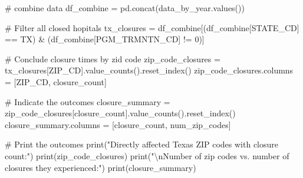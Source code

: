 \documentclass[
  letterpaper,
  DIV=11,
  numbers=noendperiod]{scrartcl}
\newenvironment{Shaded}{\begin{snugshade}}{\end{snugshade}}
\newcommand{\BuiltInTok}[1]{\textcolor[rgb]{0.00,0.23,0.31}{#1}}
\newcommand{\CharTok}[1]{\textcolor[rgb]{0.13,0.47,0.30}{#1}}
\newcommand{\CommentTok}[1]{\textcolor[rgb]{0.37,0.37,0.37}{#1}}
\newcommand{\DecValTok}[1]{\textcolor[rgb]{0.68,0.00,0.00}{#1}}
\newcommand{\NormalTok}[1]{\textcolor[rgb]{0.00,0.23,0.31}{#1}}
\newcommand{\OperatorTok}[1]{\textcolor[rgb]{0.37,0.37,0.37}{#1}}
\newcommand{\StringTok}[1]{\textcolor[rgb]{0.13,0.47,0.30}{#1}}
\begin{document}
\begin{Shaded}
\begin{Highlighting}[]
\CommentTok{\# combine data}
\NormalTok{df\_combine }\OperatorTok{=}\NormalTok{ pd.concat(data\_by\_year.values())}

\CommentTok{\# Filter all closed hopitals}
\NormalTok{tx\_closures }\OperatorTok{=}\NormalTok{ df\_combine[(df\_combine[}\StringTok{\textquotesingle{}STATE\_CD\textquotesingle{}}\NormalTok{] }\OperatorTok{==} \StringTok{\textquotesingle{}TX\textquotesingle{}}\NormalTok{) }\OperatorTok{\&}\NormalTok{ (df\_combine[}\StringTok{\textquotesingle{}PGM\_TRMNTN\_CD\textquotesingle{}}\NormalTok{] }\OperatorTok{!=} \DecValTok{0}\NormalTok{)]}

\CommentTok{\# Conclude closure times by zid code}
\NormalTok{zip\_code\_closures }\OperatorTok{=}\NormalTok{ tx\_closures[}\StringTok{\textquotesingle{}ZIP\_CD\textquotesingle{}}\NormalTok{].value\_counts().reset\_index()}
\NormalTok{zip\_code\_closures.columns }\OperatorTok{=}\NormalTok{ [}\StringTok{\textquotesingle{}ZIP\_CD\textquotesingle{}}\NormalTok{, }\StringTok{\textquotesingle{}closure\_count\textquotesingle{}}\NormalTok{]}

\CommentTok{\# Indicate the outcomes}
\NormalTok{closure\_summary }\OperatorTok{=}\NormalTok{ zip\_code\_closures[}\StringTok{\textquotesingle{}closure\_count\textquotesingle{}}\NormalTok{].value\_counts().reset\_index()}
\NormalTok{closure\_summary.columns }\OperatorTok{=}\NormalTok{ [}\StringTok{\textquotesingle{}closure\_count\textquotesingle{}}\NormalTok{, }\StringTok{\textquotesingle{}num\_zip\_codes\textquotesingle{}}\NormalTok{]}

\CommentTok{\# Print the outcomes}
\BuiltInTok{print}\NormalTok{(}\StringTok{"Directly affected Texas ZIP codes with closure count:"}\NormalTok{)}
\BuiltInTok{print}\NormalTok{(zip\_code\_closures)}
\BuiltInTok{print}\NormalTok{(}\StringTok{"}\CharTok{\textbackslash{}n}\StringTok{Number of zip codes vs. number of closures they experienced:"}\NormalTok{)}
\BuiltInTok{print}\NormalTok{(closure\_summary)}
\end{Highlighting}
\end{Shaded}
\end{document}
